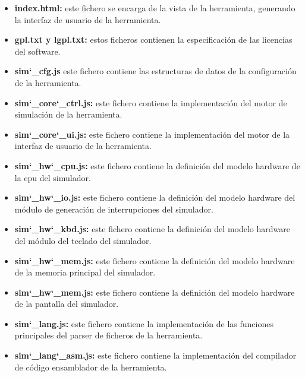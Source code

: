 \begin{itemize}

\item \textbf{index.html: } este fichero se encarga de la vista de la herramienta, generando la interfaz de usuario de la herramienta.

\item \textbf{gpl.txt y lgpl.txt: } estos ficheros contienen la especificación de las licencias del software.

\item \textbf{sim\char`_cfg.js} este fichero contiene las estructuras de datos de la configuración de la herramienta.

\item \textbf{sim\char`_core\char`_ctrl.js:}  este fichero contiene la implementación del motor de simulación de la herramienta.

\item \textbf{sim\char`_core\char`_ui.js: } este fichero contiene la implementación del motor de la interfaz de usuario de la herramienta.

\item \textbf{sim\char`_hw\char`_cpu.js: } este fichero contiene la definición del modelo hardware de la cpu del simulador.

\item \textbf{sim\char`_hw\char`_io.js: } este fichero contiene la definición del modelo hardware del módulo de generación de interrupciones del simulador.

\item \textbf{sim\char`_hw\char`_kbd.js: } este fichero contiene la definición del modelo hardware del módulo del teclado del simulador.

\item \textbf{sim\char`_hw\char`_mem.js: } este fichero contiene la definición del modelo hardware de la memoria principal del simulador.

\item \textbf{sim\char`_hw\char`_mem.js: } este fichero contiene la definición del modelo hardware de la pantalla del simulador.

\item \textbf{sim\char`_lang.js: } este fichero contiene la implementación de las funciones principales del parser de ficheros de la herramienta.

\item \textbf{sim\char`_lang\char`_asm.js: } este fichero contiene la implementación del compilador de código ensamblador de la herramienta.


\end{itemize}
